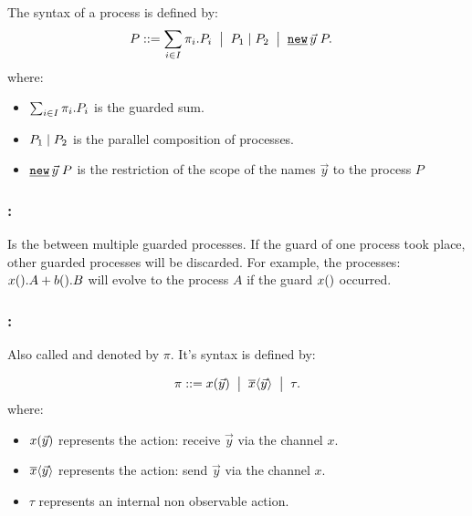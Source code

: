 \begin{definition}
\label{def_process_syntax}
The syntax of a \picalc{} process  is defined by: 
\begin{align*}
 P & \syntdef \procsum \ebnf \procpar{P_1}{P_2} \ebnf \procres{\vec{y}}{P}.
\end{align*}
where:
\begin{itemize}
\item $\sum_{i\in I}{\pi_i.P_i}$ is the guarded sum.
\item $P_1 \mid P_2$ is the parallel composition of processes.
\item $\procres{\vec{y}}{P}$ is the restriction of the scope of the names $\vec{y}$ to the process $P$
\end{itemize}
\end{definition}

\subsubsection{:} Is the  between multiple guarded processes. If the guard of one process took place, other guarded processes will be discarded. For example, the processes: $x().A + b().B$ will evolve to the process $A$ if the guard $x()$ occurred.
\subsubsection{:} Also called  and denoted by $\pi$. It's syntax is defined by:
\begin{definition}
\label{def_prefix_syntax}
\begin{align*}
 \pi ::= x(\vec{y}) \;\bigm|\; \overline{x}\langle\vec{y}\rangle \;\bigm|\; \tau.
\end{align*}
where:
\begin{itemize}
\item $x(\vec{y})$ represents the action: receive $\vec{y}$ via the channel $x$.
\item $\overline{x}\langle\vec{y}\rangle$ represents the action: send $\vec{y}$ via the channel $x$.
\item $\tau$ represents an internal non observable action.
\end{itemize}
\end{definition}
 
